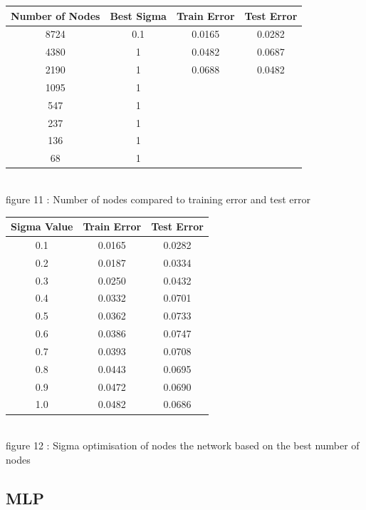\documentclass{IEEEtran}[11pt]
\begin{document}
\begin{center}
\begin{tabular}{||c c c c||}
  \hline
Number of Nodes & Best Sigma & Train Error & Test Error \\ [0.5ex]
\hline
8724 & 0.1 & 0.0165 & 0.0282 \\
4380 & 1 & 0.0482 & 0.0687 \\
2190 & 1 & 0.0688 & 0.0482 \\
1095 & 1\\
547  & 1\\
237  & 1\\
136  & 1\\
68   & 1\\
\end{tabular}
\\
\vspace{2.5mm}
{\footnotesize figure 11 : Number of nodes compared to training error and
test error}
\end{center}
\begin{center}
\begin{tabular}{||c c c||}
  \hline
Sigma Value & Train Error & Test Error \\ [0.5ex]
\hline
0.1 & 0.0165 & 0.0282 \\
0.2 & 0.0187 & 0.0334 \\
0.3 & 0.0250 & 0.0432 \\
0.4 & 0.0332 & 0.0701 \\
0.5 & 0.0362 & 0.0733 \\
0.6 & 0.0386 & 0.0747 \\
0.7 & 0.0393 & 0.0708 \\
0.8 & 0.0443 & 0.0695 \\
0.9 & 0.0472 & 0.0690 \\
1.0 & 0.0482 & 0.0686 \\
\hline
\end{tabular}
\\
\vspace{2.5mm}
{\footnotesize figure 12 : Sigma optimisation of nodes the network based on the
best number of nodes}
\end{center}
\subsection{MLP}
\end{document}
